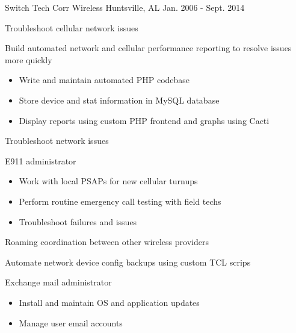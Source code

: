\begin{cventries}
  \cventry
    {Switch Tech} %
    {Corr Wireless} %
    {Huntsville, AL} %
    {Jan. 2006 - Sept. 2014} %
    {
      \begin{cvitems} %
        \item {Troubleshoot cellular network issues}
        \item {Build automated network and cellular performance reporting to resolve issues more quickly}
            \begin{itemize}
                \item {Write and maintain automated PHP codebase}
                \item {Store device and stat information in MySQL database}
                \item {Display reports using custom PHP frontend and graphs using Cacti}
            \end{itemize}
        \item {Troubleshoot network issues}
        \item {E911 administrator}
            \begin{itemize}
                \item {Work with local PSAPs for new cellular turnups}
                \item {Perform routine emergency call testing with field techs}
                \item {Troubleshoot failures and issues}
            \end{itemize}
        \item {Roaming coordination between other wireless providers}
        \item {Automate network device config backups using custom TCL scrips}
        \item {Exchange mail administrator}
            \begin{itemize}
                \item {Install and maintain OS and application updates}
                \item {Manage user email accounts}
            \end{itemize}
      \end{cvitems}
    }

\end{cventries}
